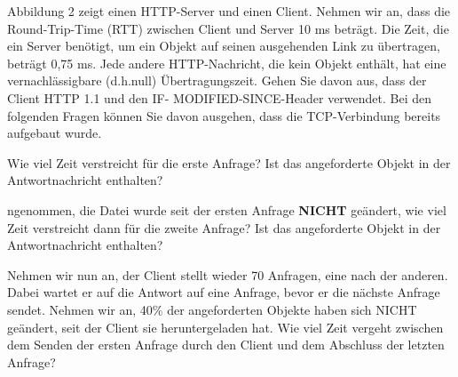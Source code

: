 \Aufgabenstellung%
Abbildung 2 zeigt einen HTTP-Server und einen Client. Nehmen wir an, dass die Round-Trip-Time (RTT) zwischen Client und Server 10 ms beträgt.
Die Zeit, die ein Server
benötigt, um ein Objekt auf seinen ausgehenden Link zu übertragen, beträgt 0,75 ms.
Jede andere HTTP-Nachricht, die kein Objekt enthält, hat eine vernachlässigbare (d.h.null) Übertragungszeit. Gehen Sie davon aus, dass der Client HTTP 1.1 und den IF-
MODIFIED-SINCE-Header verwendet. Bei den folgenden Fragen können Sie davon
ausgehen, dass die TCP-Verbindung bereits aufgebaut wurde.


\Teilaufgabe%
Wie viel Zeit verstreicht für die erste Anfrage? Ist das angeforderte Objekt in der
Antwortnachricht enthalten?


\Teilaufgabe%
ngenommen, die Datei wurde seit der ersten Anfrage \textbf{NICHT} geändert, wie viel
Zeit verstreicht dann für die zweite Anfrage? Ist das angeforderte Objekt in der
Antwortnachricht enthalten?


\Teilaufgabe%
Nehmen wir nun an, der Client stellt wieder 70 Anfragen, eine nach der anderen.
Dabei wartet er auf die Antwort auf eine Anfrage, bevor er die nächste Anfrage
sendet. Nehmen wir an, 40\% der angeforderten Objekte haben sich NICHT geändert,
seit der Client sie heruntergeladen hat. Wie viel Zeit vergeht zwischen dem
Senden der ersten Anfrage durch den Client und dem Abschluss der letzten Anfrage?







